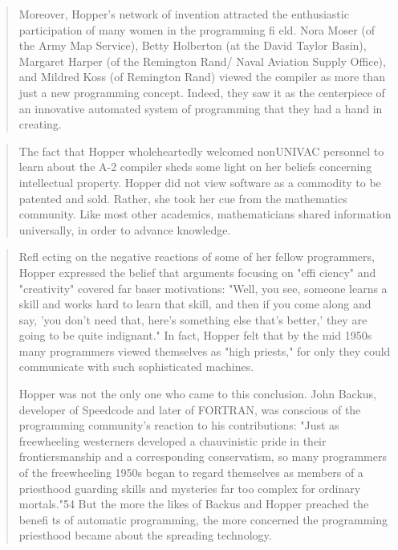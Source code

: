 \begin{quotation}
Moreover, Hopper's network of invention attracted the enthusiastic participation of many women in the programming fi eld.
Nora Moser (of the Army Map Service), Betty Holberton (at the
David Taylor Basin), Margaret Harper (of the Remington Rand/
Naval Aviation Supply Office), and Mildred Koss (of Remington
Rand) viewed the compiler as more than just a new programming concept. Indeed, they saw it as the centerpiece of an innovative automated system of programming that they had a hand
in creating.
\end{quotation}
\begin{quotation}
The fact that Hopper wholeheartedly welcomed nonUNIVAC personnel to learn about the A-2 compiler sheds some
light on her beliefs concerning intellectual property. Hopper did
not view software as a commodity to be patented and sold.
Rather, she took her cue from the mathematics community. Like
most other academics, mathematicians shared information universally, in order to advance knowledge.
\end{quotation}
\begin{quotation}
Refl ecting on the negative reactions of some of her fellow
programmers, Hopper expressed the belief that arguments focusing on "effi ciency" and "creativity" covered far baser motivations:
"Well, you see, someone learns a skill and works hard to learn
that skill, and then if you come along and say, 'you don't need
that, here's something else that's better,' they are going to be quite
indignant." In fact, Hopper felt that by the mid 1950s many
programmers viewed themselves as "high priests," for only they
could communicate with such sophisticated machines.

Hopper was not the only one who came to this conclusion.
John Backus, developer of Speedcode and later of FORTRAN,
was conscious of the programming community's reaction to his
contributions: "Just as freewheeling westerners developed a chauvinistic pride in their frontiersmanship and a corresponding conservatism, so many programmers of the freewheeling 1950s began
to regard themselves as members of a priesthood guarding skills
and mysteries far too complex for ordinary mortals."54 But the
more the likes of Backus and Hopper preached the benefi ts of
automatic programming, the more concerned the programming
priesthood became about the spreading technology.
\end{quotation}



